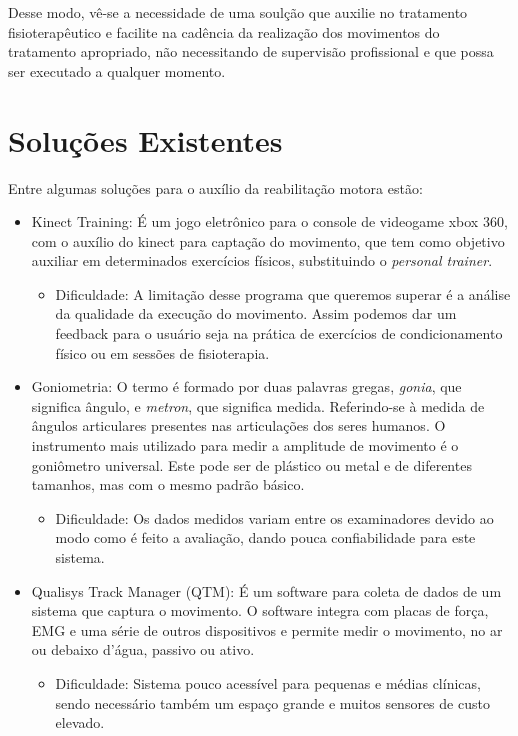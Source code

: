   Desse modo, vê-se a necessidade de uma soulção que
   auxilie no tratamento fisioterapêutico e facilite na cadência
  da realização dos movimentos do tratamento apropriado, não necessitando de
  supervisão profissional e que possa ser executado a qualquer momento.


\section{Soluções Existentes}
\label{Sec:SolucoesExistentes}
Entre algumas soluções para o auxílio da reabilitação motora estão:
\begin{itemize}

\item Kinect Training: É um jogo eletrônico para o console de videogame xbox
360, com o auxílio do kinect para captação do movimento, que tem como objetivo
auxiliar em determinados exercícios físicos, substituindo o \textit{personal trainer}.
  \begin{itemize}
  \item Dificuldade: A limitação desse programa que queremos superar é a
  análise da qualidade da execução do movimento. Assim podemos dar um feedback
  para o usuário seja na prática de exercícios de  condicionamento físico ou em
  sessões de fisioterapia.
  \end{itemize}

\item Goniometria: O termo é formado por duas palavras gregas, \textit{gonia},
que significa ângulo, e \textit{metron}, que significa medida. Referindo-se à
medida de ângulos articulares presentes nas articulações dos seres humanos.
O instrumento mais utilizado para medir a amplitude de movimento é o goniômetro
universal. Este pode ser de plástico ou metal e de diferentes tamanhos, mas com
 o mesmo padrão básico\cite{manualGoniometria}.
  \begin{itemize}
  \item Dificuldade: Os dados medidos variam entre os examinadores devido ao modo como
  é feito a avaliação, dando pouca confiabilidade para este sistema.
  \end{itemize}

\item Qualisys Track Manager (QTM): É um software para coleta de dados de um
sistema que captura o movimento. O software integra com placas de força, EMG
e uma série de outros dispositivos e permite medir o movimento, no ar
ou debaixo d'água, passivo ou ativo\cite{qtm}.
  \begin{itemize}
  \item Dificuldade: Sistema pouco acessível para pequenas e médias clínicas,
  sendo necessário também um espaço grande e muitos sensores de custo elevado.
  \end{itemize}


\end{itemize}
